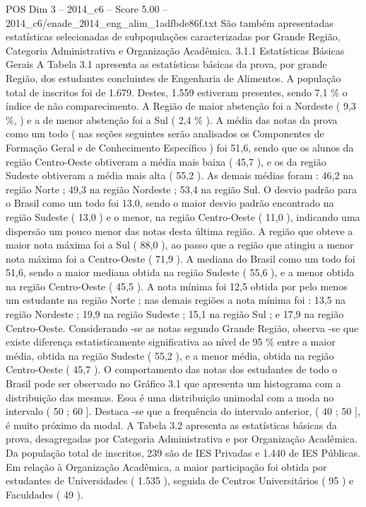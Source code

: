 \begin{textsample}{POS Dim 3 – 2014\_c6 – Score 5.00 – 2014\_c6/enade\_2014\_eng\_alim\_1adfbde86f.txt}
São também apresentadas estatísticas selecionadas de subpopulações caracterizadas por Grande Região, Categoria Administrativa e Organização Acadêmica. 3.1.1 Estatísticas Básicas Gerais A Tabela 3.1 apresenta as estatísticas básicas da prova, por grande Região, dos estudantes concluintes de Engenharia de Alimentos.
A população total de inscritos foi de 1.679.
Destes, 1.559 estiveram presentes, sendo 7,1 \% o índice de não comparecimento.
A Região de maior abstenção foi a Nordeste ( 9,3 \%, ) e a de menor abstenção foi a Sul ( 2,4 \% ).
A média das notas da prova como um todo ( nas seções seguintes serão analisados os Componentes de Formação Geral e de Conhecimento Específico ) foi 51,6, sendo que os alunos da região Centro-Oeste obtiveram a média mais baixa ( 45,7 ), e os da região Sudeste obtiveram a média mais alta ( 55,2 ).
As demais médias foram : 46,2 na região Norte ; 49,3 na região Nordeste ; 53,4 na região Sul.
O desvio padrão para o Brasil como um todo foi 13,0, sendo o maior desvio padrão encontrado na região Sudeste ( 13,0 ) e o menor, na região Centro-Oeste ( 11,0 ), indicando uma dispersão um pouco menor das notas desta última região.
A região que obteve a maior nota máxima foi a Sul ( 88,0 ), ao passo que a região que atingiu a menor nota máxima foi a Centro-Oeste ( 71,9 ).
A mediana do Brasil como um todo foi 51,6, sendo a maior mediana obtida na região Sudeste ( 55,6 ), e a menor obtida na região Centro-Oeste ( 45,5 ).
A nota mínima foi 12,5 obtida por pelo menos um estudante na região Norte ; nas demais regiões a nota mínima foi : 13,5 na região Nordeste ; 19,9 na região Sudeste ; 15,1 na região Sul ; e 17,9 na região Centro-Oeste.
Considerando -se as notas segundo Grande Região, observa -se que existe diferença estatisticamente significativa ao nível de 95 \% entre a maior média, obtida na região Sudeste ( 55,2 ), e a menor média, obtida na região Centro-Oeste ( 45,7 ).
O comportamento das notas dos estudantes de todo o Brasil pode ser observado no Gráfico 3.1 que apresenta um histograma com a distribuição das mesmas.
Essa é uma distribuição unimodal com a moda no intervalo ( 50 ; 60 ].
Destaca -se que a frequência do intervalo anterior, ( 40 ; 50 ], é muito próximo da modal.
A Tabela 3.2 apresenta as estatísticas básicas da prova, desagregadas por Categoria Administrativa e por Organização Acadêmica.
Da população total de inscritos, 239 são de IES Privadas e 1.440 de IES Públicas.
Em relação à Organização Acadêmica, a maior participação foi obtida por estudantes de Universidades ( 1.535 ), seguida de Centros Universitários ( 95 ) e Faculdades ( 49 ).

\end{textsample}
